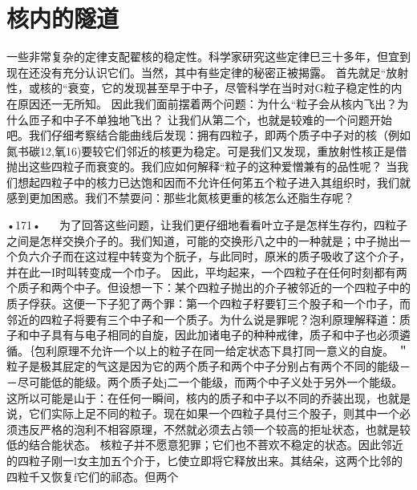 \section{核内的隧道}

一些非常复杂的定律支配翟核的稳定性。科学家研究这些定律巳三十多年，但宜到现在还没有充分认识它们。当然，其中有些定律的秘密正被揭露。
首先就足“放射性，或核的“衰变，它的发现甚至早于中子，尽管科学在当时对G粒子稳定性的内在原因还一无所知。
因此我们面前摆着两个问题：为什么“粒子会从核内飞出？为什么匝子和中子不单独地飞出？
让我们从第二个，也就是较难的一个问题开始吧。我们仔细考察结合能曲线后发现：拥有四粒子，即两个质子中子对的核（例如氮书碳12,氧16)要较它们邻近的核更为稳定。可是我们又发现，重放射性核正是借抛出这些四粒子而衰变的。我们应如何解释“粒子的这种爱憎兼有的品性呢？
当我们想起四粒子中的核力已达饱和因而不允许任何笫五个粒子进入其组织时，我们就感到更加困惑。我们不禁耍问：那些北氮核更重的核怎么还脂生存呢？

•171•
  
为了回答这些问题，让我们更仔细地看看叶立子是怎样生存彴，四粒子之间是怎样交换介子的。我们知道，可能的交换形八之中的一种就是；中子抛出一个负六介子而在这过程中转变为个朊子，与此同时，原米的质子吸收了这个介子，并在此一I时叫转变成一个巾子。
因此，平均起来，一个四粒子在任何时刻都有两个质子和两个中子。但设想一下：某个四粒子抛出的介子被邻近的一个四粒子中的质子俘获。这便一下子犯了两个罪：第一个四粒子籽要钉三个股子和一个巾子，而邻近的四粒子将要有三个中子和一个质子。为什么说是罪呢？泡利原理解释道：质子和中子具有与电子相同的自旋，因此加诸电子的种种戒律，质子和中子也必须遴循。｛包利原理不允许一个以上的粒子在同一给定状态下具打同一意义的自旋。
＂粒子是极其屁定的气这是因为它的两个质子和两个中子分别占有两个不同的能级－－尽可能低的能级。两个质子处j二一个能级，而两个中子义处于另外一个能级。这所以可能是山于：在任何一瞬间，核内的质子和中子以不同的乔装出现，也就是说，它们实际上足不同的粒子。现在如果一个四粒子具付三个股子，则其中一个必须违反严格的泡利不相容原理，不然就必须去占领一个较高的拒址状态，也就是较低的结合能状态。
核粒子并不愿意犯罪；它们也不菩欢不稳定的状态。因此邻近的四粒子刚一l女主加五个介于，匕使立即将它释放出来。其结朵，这两个比邻的四粒千又恢复f它们的祁态。但两个

